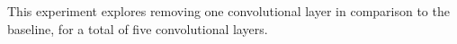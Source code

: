 
This experiment explores removing one convolutional layer in
comparison to the baseline, for a total of five
convolutional layers.
